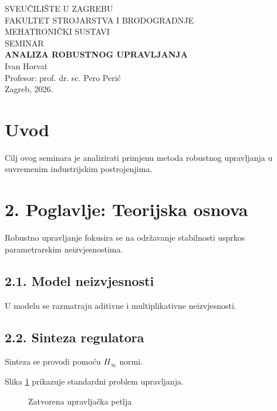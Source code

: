 \documentclass[12pt,a4paper]{article}
\begin{document}
\begin{titlepage}
    \centering
    {\large SVEUČILIŠTE U ZAGREBU\\}
    {\large FAKULTET STROJARSTVA I BRODOGRADNJE\\}
    \vspace{2.5cm}
    {\Large MEHATRONIČKI SUSTAVI\\}
    \vspace{0.5cm}
    {\Large SEMINAR\\}
    \vspace{1.5cm}
    {\Huge \textbf{ANALIZA ROBUSTNOG UPRAVLJANJA}\\}
    \vspace{1.5cm}
    {\large Ivan Horvat\\}
    \vfill
    {\large Profesor: prof. dr. sc. Pero Perić\\}
    \vspace{1cm}
    {\large Zagreb, 2026.}
\end{titlepage}

\tableofcontents
\newpage
\listoffigures
\newpage
\listoftables
\newpage
{}

\section{Uvod}
Cilj ovog seminara je analizirati primjenu metoda robustnog upravljanja u suvremenim industrijskim postrojenjima.

\section{2. Poglavlje: Teorijska osnova}
Robustno upravljanje fokusira se na održavanje stabilnosti usprkos parametrarskim neizvjesnostima.

\subsection{2.1. Model neizvjesnosti}
U modelu se razmatraju aditivne i multiplikativne neizvjesnosti.

\subsection{2.2. Sinteza regulatora}
Sinteza se provodi pomoću $H_\infty$ normi.

Slika \ref{fig:blok} prikazuje standardni problem upravljanja.
\begin{figure}[h]
    \centering
    \caption{Zatvorena upravljačka petlja}
    \label{fig:blok}
\end{figure}
\end{document}
